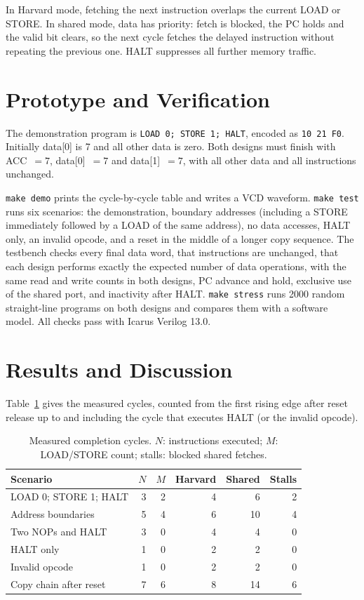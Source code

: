 \documentclass[conference,a4paper]{IEEEtran}
\begin{document}
In Harvard mode, fetching the next instruction overlaps the current LOAD
or STORE. In shared mode, data has priority: fetch is blocked, the PC
holds and the valid bit clears, so the next cycle fetches the delayed
instruction without repeating the previous one. HALT suppresses all
further memory traffic.

\section{Prototype and Verification}
The demonstration program is \texttt{LOAD 0; STORE 1; HALT}, encoded as
\texttt{10 21 F0}. Initially data[0] is 7 and all other data is zero.
Both designs must finish with ACC~$=7$, data[0]~$=7$ and data[1]~$=7$,
with all other data and all instructions unchanged.

\texttt{make demo} prints the cycle-by-cycle table and writes a VCD
waveform. \texttt{make test} runs six scenarios: the demonstration,
boundary addresses (including a STORE immediately followed by a LOAD of
the same address), no data accesses, HALT only, an invalid opcode, and a
reset in the middle of a longer copy sequence. The testbench checks every
final data word, that instructions are unchanged, that each design
performs exactly the expected number of data operations, with the same
read and write counts in both designs, PC advance and hold, exclusive use of the shared port,
and inactivity after HALT. \texttt{make stress} runs 2000 random
straight-line programs on both designs and compares them with a software
model. All checks pass with Icarus Verilog 13.0.

\section{Results and Discussion}
Table~\ref{tab:results} gives the measured cycles, counted from the
first rising edge after reset release up to and including the cycle that
executes HALT (or the invalid opcode).

\begin{table}[t]
\caption{Measured completion cycles. $N$: instructions executed;
$M$: LOAD/STORE count; stalls: blocked shared fetches.}
\label{tab:results}
\centering
\begin{tabular}{lrrrrr}
\hline
Scenario & $N$ & $M$ & Harvard & Shared & Stalls \\ \hline
LOAD 0; STORE 1; HALT & 3 & 2 & 4 & 6 & 2 \\
Address boundaries & 5 & 4 & 6 & 10 & 4 \\
Two NOPs and HALT & 3 & 0 & 4 & 4 & 0 \\
HALT only & 1 & 0 & 2 & 2 & 0 \\
Invalid opcode & 1 & 0 & 2 & 2 & 0 \\
Copy chain after reset & 7 & 6 & 8 & 14 & 6 \\ \hline
\end{tabular}
\end{table}
\end{document}
